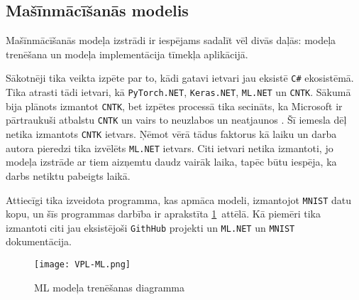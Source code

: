\subsection{Mašīnmācīšanās modelis}

    Mašīnmācīšanās modeļa izstrādi ir iespējams sadalīt vēl divās daļās: modeļa trenēšana un modeļa
    implementācija tīmekļa aplikācijā.

    Sākotnēji tika veikta izpēte par to, kādi gatavi
    ietvari jau eksistē \texttt{C\#} ekosistēmā. Tika atrasti tādi ietvari, kā \texttt{PyTorch.NET},
    \texttt{Keras.NET}, \texttt{ML.NET} un \texttt{CNTK}. Sākumā bija plānots izmantot \texttt{CNTK},
    bet izpētes processā tika secināts, ka Microsoft ir pārtraukuši atbalstu \texttt{CNTK} un vairs
    to neuzlabos un neatjaunos \cite{chrisbasogluCNTKReleaseNotes}. Šī iemesla dēļ netika izmantots
    \texttt{CNTK} ietvars. Ņēmot vērā tādus faktorus kā laiku un darba autora pieredzi tika izvēlēts
    \texttt{ML.NET} ietvars. Citi ietvari netika izmantoti, jo modeļa izstrāde ar tiem aizņemtu
    daudz vairāk laika, tapēc būtu iespēja, ka darbs netiktu pabeigts laikā.

    Attiecīgi tika izveidota programma, kas apmāca modeli, izmantojot \texttt{MNIST} datu kopu, un
    šīs programmas darbība ir aprakstīta \ref{ml:train}~attēlā. Kā piemēri tika izmantoti citi jau
    eksistējoši \texttt{GithHub} projekti un \texttt{ML.NET} un \texttt{MNIST} dokumentācija.
    \cite{DotnetMachinelearningsamples2021} \cite{kexugitTestRunWorking} \cite{MLNETTutorial}
    \cite{natkeMLNETDocumentation} \cite{paxbunPaxbunCntkMnistPractice2019}

    \begin{figure}[H]
        \centering
        \texttt{[image: VPL-ML.png]}
        \caption{ML modeļa trenēšanas diagramma}
        \label{ml:train}
    \end{figure}


